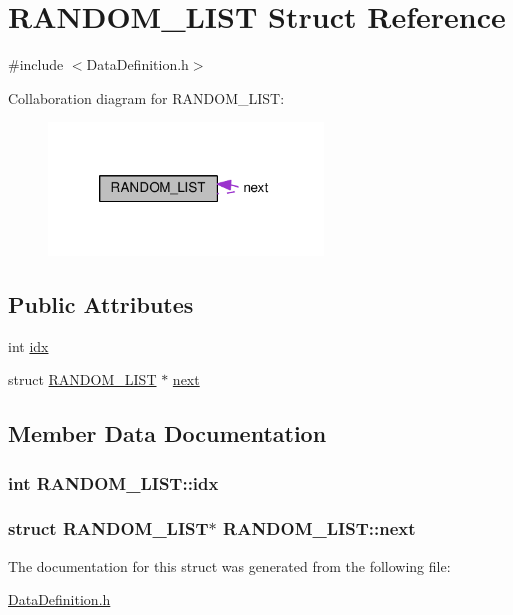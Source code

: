 \hypertarget{structRANDOM__LIST}{\section{R\-A\-N\-D\-O\-M\-\_\-\-L\-I\-S\-T Struct Reference}
\label{structRANDOM__LIST}
}


{\ttfamily \#include $<$Data\-Definition.\-h$>$}



Collaboration diagram for R\-A\-N\-D\-O\-M\-\_\-\-L\-I\-S\-T\-:
\nopagebreak
\begin{figure}[H]
\begin{center}
\leavevmode
\includegraphics[width=207pt]{structRANDOM__LIST__coll__graph}
\end{center}
\end{figure}
\subsection*{Public Attributes}
\begin{DoxyCompactItemize}
\item 
int \hyperlink{structRANDOM__LIST_a6cd2e0e1e170a5692dc48a4d4c87bdc6}{idx}
\item 
struct \hyperlink{structRANDOM__LIST}{R\-A\-N\-D\-O\-M\-\_\-\-L\-I\-S\-T} $\ast$ \hyperlink{structRANDOM__LIST_a69d18749d83881f09a2742cd6ba19d28}{next}
\end{DoxyCompactItemize}


\subsection{Member Data Documentation}
\hypertarget{structRANDOM__LIST_a6cd2e0e1e170a5692dc48a4d4c87bdc6}{
\subsubsection[{idx}]{\setlength{\rightskip}{0pt plus 5cm}int R\-A\-N\-D\-O\-M\-\_\-\-L\-I\-S\-T\-::idx}}\label{structRANDOM__LIST_a6cd2e0e1e170a5692dc48a4d4c87bdc6}
\hypertarget{structRANDOM__LIST_a69d18749d83881f09a2742cd6ba19d28}{
\subsubsection[{next}]{\setlength{\rightskip}{0pt plus 5cm}struct {\bf R\-A\-N\-D\-O\-M\-\_\-\-L\-I\-S\-T}$\ast$ R\-A\-N\-D\-O\-M\-\_\-\-L\-I\-S\-T\-::next}}\label{structRANDOM__LIST_a69d18749d83881f09a2742cd6ba19d28}


The documentation for this struct was generated from the following file\-:\begin{DoxyCompactItemize}
\item 
\hyperlink{DataDefinition_8h}{Data\-Definition.\-h}\end{DoxyCompactItemize}
